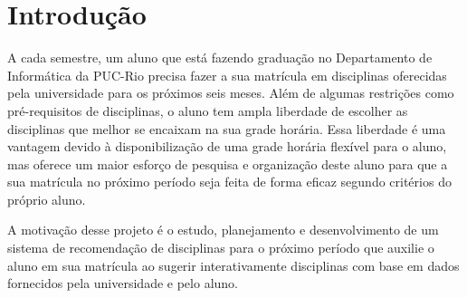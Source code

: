 
\chapter{Introdução}

A cada semestre, um aluno que está fazendo graduação no Departamento de Informática da PUC-Rio precisa fazer a sua matrícula em disciplinas oferecidas pela universidade para os próximos seis meses. Além de algumas restrições como pré-requisitos de disciplinas, o aluno tem ampla liberdade de escolher as disciplinas que melhor se encaixam na sua grade horária. Essa liberdade é uma vantagem devido à disponibilização de uma grade horária flexível para o aluno, mas oferece um maior esforço de pesquisa e organização deste aluno para que a sua matrícula no próximo período seja feita de forma eficaz segundo critérios do próprio aluno. 

A motivação desse projeto é o estudo, planejamento e desenvolvimento de um sistema de recomendação de disciplinas para o próximo período que auxilie o aluno em sua matrícula ao sugerir interativamente disciplinas com base em dados fornecidos pela universidade e pelo aluno.